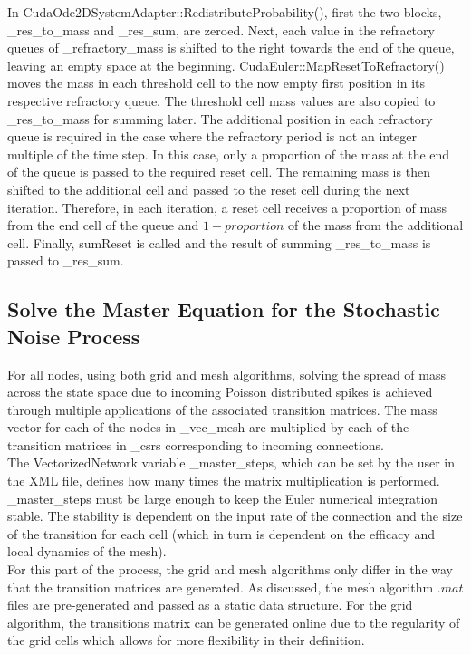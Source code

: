 \documentclass[utf8]{frontiers_suppmat} %
\begin{document}
In CudaOde2DSystemAdapter::RedistributeProbability(), first the two blocks, \_res\_to\_mass and \_res\_sum, are zeroed. Next, each value in the refractory queues of \_refractory\_mass is shifted to the right towards the end of the queue, leaving an empty space at the beginning. CudaEuler::MapResetToRefractory() moves the mass in each threshold cell to the now empty first position in its respective refractory queue. The threshold cell mass values are also copied to \_res\_to\_mass for summing later. The additional position in each refractory queue is required in the case where the refractory period is not an integer multiple of the time step. In this case, only a proportion of the mass at the end of the queue is passed to the required reset cell. The remaining mass is then shifted to the additional cell and passed to the reset cell during the next iteration. Therefore, in each iteration, a reset cell receives a proportion of mass from the end cell of the queue and $1 - proportion$ of the mass from the additional cell. Finally, sumReset is called and the result of summing \_res\_to\_mass is passed to \_res\_sum.\\

\subsection{Solve the Master Equation for the Stochastic Noise Process}

For all nodes, using both grid and mesh algorithms, solving the spread of mass across the state space due to incoming Poisson distributed spikes is achieved through multiple applications of the associated transition matrices. The mass vector for each of the nodes in \_vec\_mesh are multiplied by each of the transition matrices in \_csrs corresponding to incoming connections.\\
The VectorizedNetwork variable \_master\_steps, which can be set by the user in the XML file, defines how many times the matrix multiplication is performed. \_master\_steps must be large enough to keep the Euler numerical integration stable. The stability is dependent on the input rate of the connection and the size of the transition for each cell (which in turn is dependent on the efficacy and local dynamics of the mesh). \\
For this part of the process, the grid and mesh algorithms only differ in the way that the transition matrices are generated. As discussed, the mesh algorithm $.mat$ files are pre-generated and passed as a static data structure. For the grid algorithm, the transitions matrix can be generated online due to the regularity of the grid cells which allows for more flexibility in their definition.\\
\end{document}
